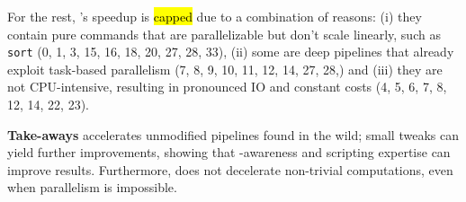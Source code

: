 \documentclass[letterpaper,twocolumn,10pt]{article}
\newcommand{\heading}[1]{\vspace{4pt}\noindent\textbf{#1}\enspace}
\newcommand{\ttt}[1]{\texttt{#1}}
\newcommand{\todo}[1]{\hl{#1}\xspace}
\newcommand{\kk}[1]{[{\color{magenta}kk: #1}]}
\begin{document}
For the rest, \sys's speedup is \todo{capped} due to a combination of reasons:
  (i) they contain pure commands that are parallelizable but don't scale linearly, such as \ttt{sort} (0, 1, 3, 15, 16, 18, 20, 27, 28, 33),
  (ii) some are deep pipelines that already exploit task-based parallelism (7, 8, 9, 10, 11, 12, 14, 27, 28,) and
  (iii) they are not CPU-intensive, resulting in pronounced IO and constant costs (4, 5, 6, 7, 8, 12, 14, 22, 23).








\heading{Take-aways} \sys accelerates unmodified pipelines found in the wild;
  small tweaks can yield further improvements, showing that \sys-awareness and scripting expertise can improve results.
Furthermore, \sys does not decelerate non-trivial computations, even when parallelism is impossible.
\end{document}
